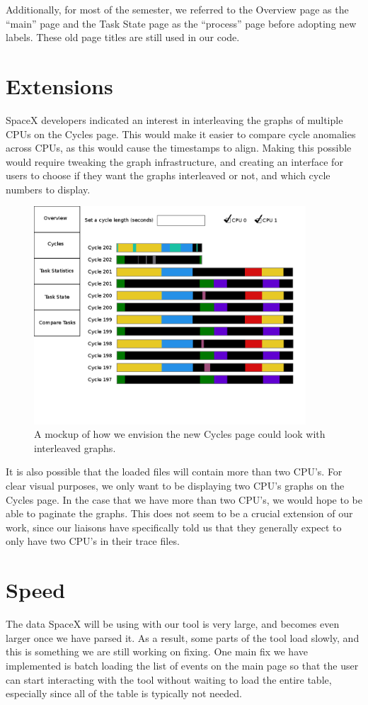 \documentclass{hmcclinic}
\begin{document}
  Additionally, for most of the semester, we referred to the Overview page as
  the ``main'' page and the Task State page as the ``process'' page before
  adopting new labels. These old page titles are still used in our code.

\section{Extensions}
  SpaceX developers indicated an interest in interleaving the graphs of multiple
  CPUs on the Cycles page.  This would make it easier to compare cycle
  anomalies across CPUs, as this would cause the timestamps to align. Making
  this possible would require tweaking the graph infrastructure, and creating an
  interface for users to choose if they want the graphs interleaved or not, and
  which cycle numbers to display.

  \begin{figure}[H]
\begin{center}
\includegraphics[width=4in]{futureCycles.png}
\caption{A mockup of how we envision the new Cycles page could look with
interleaved graphs.}
\end{center}
\end{figure}

It is also possible that the loaded files will contain more than two CPU's. For clear visual purposes, we only want to be displaying two CPU's graphs on the Cycles page. In the case that we have more than two CPU's, we would hope to be able to paginate the graphs. This does not seem to be a crucial extension of our work, since our liaisons have specifically told us that they generally expect to only have two CPU's in their trace files.


\section{Speed} %
The data SpaceX will be using with our tool is very large, and becomes even
larger once we have parsed it. As a result, some parts of the tool load slowly,
and this is something we are still working on fixing. One main fix we have
implemented is batch loading the list of events on the main page so that the
user can start interacting with the tool without waiting to load the entire
table, especially since all of the table is typically not needed.
\end{document}
